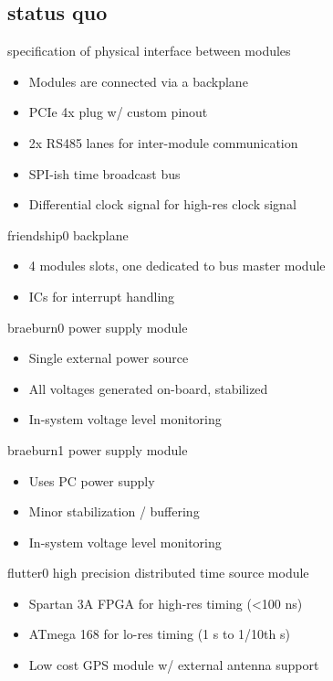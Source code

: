 \subsection{status quo}
  \begin{frame}{specification of physical interface between modules}
		\begin{itemize}
			\item Modules are connected via a backplane
			\item PCIe 4x plug w/ custom pinout
			\item 2x RS485 lanes for inter-module communication
			\item SPI-ish time broadcast bus
			\item Differential clock signal for high-res clock signal
		\end{itemize}
	\end{frame}
	\begin{frame}{friendship0 backplane}
		\begin{itemize}
			\item 4 modules slots, one dedicated to bus master module
			\item ICs for interrupt handling
		\end{itemize}
	\end{frame}
	\begin{frame}{braeburn0 power supply module}
		\begin{itemize}
			\item Single external power source
			\item All voltages generated on-board, stabilized
			\item In-system voltage level monitoring
		\end{itemize}
	\end{frame}
	\begin{frame}{braeburn1 power supply module}
		\begin{itemize}
			\item Uses PC power supply
			\item Minor stabilization / buffering
			\item In-system voltage level monitoring
		\end{itemize}
	\end{frame}
	\begin{frame}{flutter0 high precision distributed time source module}
		\begin{itemize}
			\item Spartan 3A FPGA for high-res timing (<100 ns)
			\item ATmega 168 for lo-res timing (1 s to 1/10th s)
			\item Low cost GPS module w/ external antenna support
		\end{itemize}
	\end{frame}
